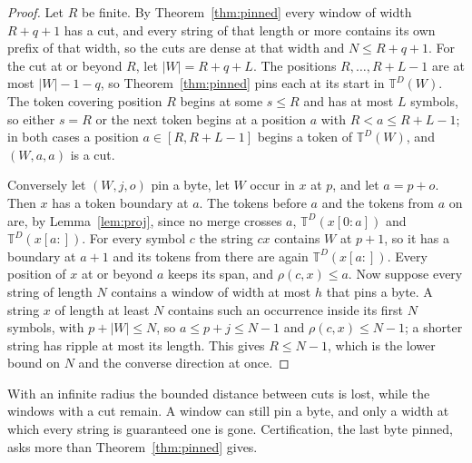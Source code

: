 \documentclass[11pt,a4paper]{article}
\theoremstyle{definition}
\theoremstyle{plain}
\newcommand{\T}{\mathbb{T}}
\begin{document}
\begin{proof}
Let \(R\) be finite. By Theorem~\ref{thm:pinned} every window of width \(R + q + 1\) has a cut, and every string of that
length or more contains its own prefix of that width, so the cuts are dense at that width and \(N \le R + q + 1\). For
the cut at or beyond \(R\), let \(|W| = R + q + L\). The positions \(R, \dots, R + L - 1\) are at most \(|W| - 1 - q\),
so Theorem~\ref{thm:pinned} pins each at its start in \(\T^D(W)\). The token covering position \(R\) begins at some
\(s \le R\) and has at most \(L\) symbols, so either \(s = R\) or the next token begins at a position \(a\) with
\(R < a \le R + L - 1\); in both cases a position \(a \in [R, R + L - 1]\) begins a token of \(\T^D(W)\), and
\((W, a, a)\) is a cut.

Conversely let \((W, j, o)\) pin a byte, let \(W\) occur in \(x\) at \(p\), and let \(a = p + o\). Then \(x\) has a
token boundary at \(a\). The tokens before \(a\) and the tokens from \(a\) on are, by Lemma~\ref{lem:proj}, since no
merge crosses \(a\), \(\T^D(x[0{:}a])\) and \(\T^D(x[a{:}])\). For every symbol \(c\) the string \(cx\) contains \(W\)
at \(p + 1\), so it has a boundary at \(a + 1\) and its tokens from there are again \(\T^D(x[a{:}])\). Every position of
\(x\) at or beyond \(a\) keeps its span, and \(\rho(c, x) \le a\). Now suppose every string of length \(N\) contains a
window of width at most \(h\) that pins a byte. A string \(x\) of length at least \(N\) contains such an occurrence
inside its first \(N\) symbols, with \(p + |W| \le N\), so \(a \le p + j \le N - 1\) and \(\rho(c, x) \le N - 1\); a
shorter string has ripple at most its length. This gives \(R \le N - 1\), which is the lower bound on \(N\) and the
converse direction at once.
\end{proof}

With an infinite radius the bounded distance between cuts is lost, while the windows with a cut remain. A window can
still pin a byte, and only a width at which every string is guaranteed one is gone. Certification, the last byte pinned,
asks more than Theorem~\ref{thm:pinned} gives.

\end{document}
